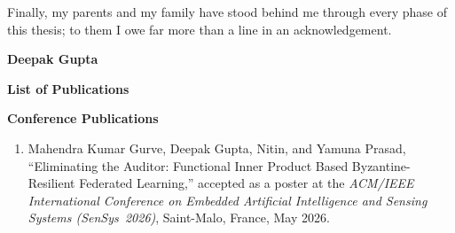 Finally, my parents and my family have stood behind me through every phase of this thesis; to them I owe far more than a line in an acknowledgement.

\vspace*{2mm}
\begin{flushright}
	\textbf{Deepak Gupta}
\end{flushright}

\newpage
\thispagestyle{empty}
\cleardoublepage

\newpage
\thispagestyle{plain}
\begin{center}
\textbf{\Large List of Publications}
\end{center}

\vspace{0.5cm}

\noindent \textbf{\large Conference Publications}
\begin{enumerate}
	\item Mahendra Kumar Gurve, Deepak Gupta, Nitin, and Yamuna Prasad, ``Eliminating the Auditor: Functional Inner Product Based Byzantine-Resilient Federated Learning,'' accepted as a poster at the \textit{ACM/IEEE International Conference on Embedded Artificial Intelligence and Sensing Systems (SenSys~2026)}, Saint-Malo, France, May 2026.
\end{enumerate}

\newpage
\thispagestyle{empty}
\cleardoublepage
